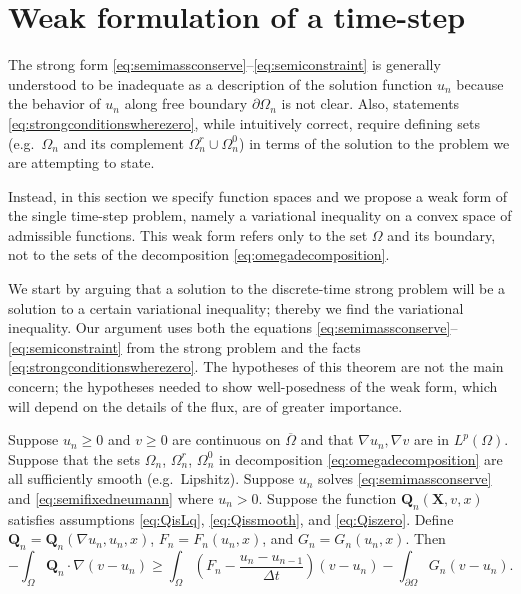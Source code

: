 \documentclass[final,leqno,onefignum,onetabnum]{siamltex1213bueler}
\newcommand\bQ{\mathbf{Q}}
\newcommand\bX{\mathbf{X}}
\renewcommand{\grad}{\nabla}
\begin{document}
\section{Weak formulation of a time-step}  \label{sec:weakform}

The strong form \eqref{eq:semimassconserve}--\eqref{eq:semiconstraint} is generally understood to be inadequate as a description of the solution function $u_n$ because the behavior of $u_n$ along free boundary $\partial\Omega_n$ is not clear.  Also, statements \eqref{eq:strongconditionswherezero}, while intuitively correct, require defining sets (e.g.~$\Omega_n$ and its complement $\Omega_n^r \cup \Omega_n^0$) in terms of the solution to the problem we are attempting to state.

Instead, in this section we specify function spaces and we propose a weak form of the single time-step problem, namely a variational inequality \cite{Friedman,KinderlehrerStampacchia} on a convex space of admissible functions.  This weak form refers only to the set $\Omega$ and its boundary, not to the sets of the decomposition \eqref{eq:omegadecomposition}.

We start by arguing that a solution to the discrete-time strong problem will be a solution to a certain variational inequality; thereby we find the variational inequality.  Our argument uses both the equations  \eqref{eq:semimassconserve}--\eqref{eq:semiconstraint} from the strong problem and the facts \eqref{eq:strongconditionswherezero}.  The hypotheses of this theorem are not the main concern; the hypotheses needed to show well-posedness of the weak form, which will depend on the details of the flux, are of greater importance.

\medskip
\begin{theorem} \label{thm:strongimpliesweak} Suppose $u_n\ge 0$ and $v\ge 0$ are continuous on $\overline{\Omega}$ and that $\grad u_n,\grad v$ are in $L^p(\Omega)$.  Suppose that the sets $\Omega_n$, $\Omega_n^r$, $\Omega_n^0$ in decomposition \eqref{eq:omegadecomposition} are all sufficiently smooth (e.g.~Lipshitz).  Suppose $u_n$ solves \eqref{eq:semimassconserve} and \eqref{eq:semifixedneumann} where $u_n>0$.  Suppose the function $\bQ_n(\bX,v,x)$ satisfies assumptions \eqref{eq:QisLq}, \eqref{eq:Qissmooth}, and \eqref{eq:Qiszero}.  Define $\bQ_n=\bQ_n(\grad u_n,u_n,x)$, $F_n = F_n(u_n,x)$, and $G_n=G_n(u_n,x)$.  Then
\begin{equation}
-\int_{\Omega} \bQ_n \cdot \grad(v-u_n) \ge \int_{\Omega} \left(F_n - \frac{u_n - u_{n-1}}{\Delta t}\right) (v-u_n) - \int_{\partial \Omega} G_n (v-u_n). \label{eq:morallytheVI}
\end{equation}
\end{theorem}
\end{document}
